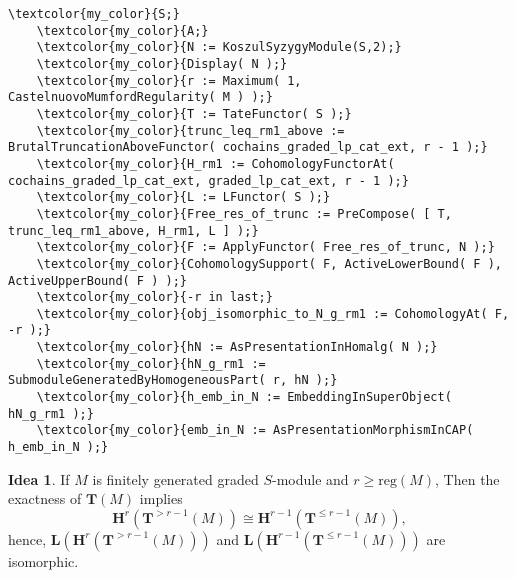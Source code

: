 \documentclass[16pt,a4paper]{extarticle}
\theoremstyle{definition}
\newtheorem{idea}{Idea}
\theoremstyle{theorem}
\newcommand{\LL}{\mathbf{L}}
\newcommand{\HH}{\mathbf{H}}
\newcommand{\TT}{\mathbf{T}}
\begin{document}
    \begin{Verbatim}[commandchars=\\\{\}, fontseries=b, frame=single, label=Gap Code, framerule=0.5mm, rulecolor=\color{rule_color} ]
    \textcolor{my_color}{S;}
    \textcolor{my_color}{A;}
    \textcolor{my_color}{N := KoszulSyzygyModule(S,2);}
    \textcolor{my_color}{Display( N );}
    \textcolor{my_color}{r := Maximum( 1, CastelnuovoMumfordRegularity( M ) );}
    \textcolor{my_color}{T := TateFunctor( S );}
    \textcolor{my_color}{trunc_leq_rm1_above := BrutalTruncationAboveFunctor( cochains_graded_lp_cat_ext, r - 1 );}
    \textcolor{my_color}{H_rm1 := CohomologyFunctorAt( cochains_graded_lp_cat_ext, graded_lp_cat_ext, r - 1 );}
    \textcolor{my_color}{L := LFunctor( S );}
    \textcolor{my_color}{Free_res_of_trunc := PreCompose( [ T, trunc_leq_rm1_above, H_rm1, L ] );}
    \textcolor{my_color}{F := ApplyFunctor( Free_res_of_trunc, N );}
    \textcolor{my_color}{CohomologySupport( F, ActiveLowerBound( F ), ActiveUpperBound( F ) );}
    \textcolor{my_color}{-r in last;}
    \textcolor{my_color}{obj_isomorphic_to_N_g_rm1 := CohomologyAt( F, -r );}
    \textcolor{my_color}{hN := AsPresentationInHomalg( N );}
    \textcolor{my_color}{hN_g_rm1 := SubmoduleGeneratedByHomogeneousPart( r, hN );}
    \textcolor{my_color}{h_emb_in_N := EmbeddingInSuperObject( hN_g_rm1 );}
    \textcolor{my_color}{emb_in_N := AsPresentationMorphismInCAP( h_emb_in_N );}
    \end{Verbatim}
    
    \begin{idea}
        If $M$ is finitely generated graded $S$-module and $r\geq\mathrm{reg}(M)$, Then the exactness of $\TT(M)$ implies
        $$\HH^r( \TT^{> r-1}(M))\cong \HH^{r-1}( \TT^{\leq r-1}(M)),$$ hence, 
        $\LL(\HH^r( \TT^{> r-1}(M)) )$ and $\LL(\HH^{r-1}( \TT^{\leq r-1}(M)) )$ are isomorphic.
    \end{idea}
\end{document}
